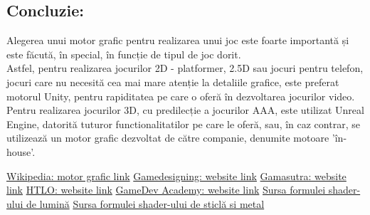 \documentclass[12pt]{article}
\begin{document}
\subsection{Concluzie:}
\hspace{15pt} Alegerea unui motor grafic pentru realizarea unui joc este foarte importantă și este făcută, în special, în funcție de tipul de joc dorit. \\

Astfel, pentru realizarea jocurilor 2D - platformer, 2.5D sau jocuri pentru telefon, jocuri care nu necesită cea mai mare atenție la detaliile grafice, este preferat motorul Unity, pentru rapiditatea pe care o oferă în dezvoltarea jocurilor video. \\

Pentru realizarea jocurilor 3D, cu predilecție a jocurilor AAA, este utilizat Unreal Engine, datorită tuturor functionalitatilor pe care le oferă, sau, în caz contrar, se utilizează un motor grafic dezvoltat de către companie, denumite motoare 'în-house'.



\newpage
\begin{thebibliography}{}
\href{https://ro.wikipedia.org/wiki/Motor_grafic}{Wikipedia: motor grafic link}
\href{https://www.gamedesigning.org/career/video-game-engines/}{Gamedesigning: website link}
\href{https://www.gamasutra.com/}{Gamasutra: website link}
\href{https://www.htlo.co.uk/unity-vs-unreal-engine-a-quick-comparison/}{HTLO: website link}
\href{https://gamedevacademy.org/unity-vs-unreal/}{GameDev Academy: website link}
\href{http://ogldev.atspace.co.uk/www/tutorial20/tutorial20.html}{Sursa formulei shader-ului de lumină}
\href{https://cs.brown.edu/courses/cs123/labs/lab09.pdf}{Sursa formulei shader-ului de sticlă si metal}
\end{thebibliography}
\end{document}
